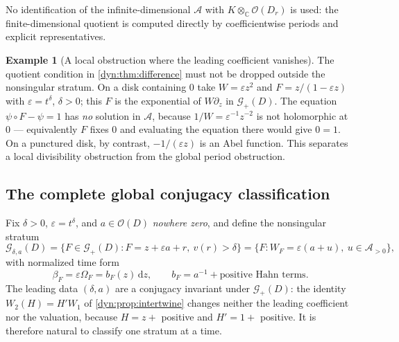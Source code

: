 \documentclass[11pt,letterpaper]{article}
\theoremstyle{definition}
\newtheorem{example}[example]{Example}
\theoremstyle{remark}
\newcommand{\C}{\mathbb C}
\newcommand{\OO}{\mathcal O}
\newcommand{\GG}{\mathscr G}
\newcommand{\AAA}{\mathscr A}
\newcommand{\eps}{\varepsilon}
\newcommand{\dd}{\,\mathrm d}
\numberwithin{equation}{section}
\begin{document}
No identification of the infinite-dimensional $\AAA$ with
$K\otimes_\C\OO(D_r)$ is used: the finite-dimensional quotient is computed
directly by coefficientwise periods and explicit representatives.

\begin{example}[A local obstruction where the leading coefficient vanishes]
\label{dyn:ex:localobstruction}
The quotient condition in \cref{dyn:thm:difference} must not be dropped
outside the nonsingular stratum. On a disk containing $0$ take
$W=\eps z^{2}$ and $F=z/(1-\eps z)$ with $\eps=t^{\delta}$, $\delta>0$;
this $F$ is the exponential of $W\partial_z$ in $\GG_+(D)$. The equation
$\psi\circ F-\psi=1$ has \emph{no} solution in $\AAA$, because
$1/W=\eps^{-1}z^{-2}$ is not holomorphic at $0$ --- equivalently $F$ fixes
$0$ and evaluating the equation there would give $0=1$. On a punctured
disk, by contrast, $-1/(\eps z)$ is an Abel function. This separates a
local divisibility obstruction from the global period obstruction.
\end{example}

\subsection{The complete global conjugacy classification}
Fix $\delta>0$, $\eps=t^{\delta}$, and $a\in\OO(D)$ \emph{nowhere zero},
and define the nonsingular stratum
\begin{equation}\label{dyn:eq:stratum}
 \GG_{\delta,a}(D)=\{F\in\GG_+(D):F=z+\eps a+r,\ v(r)>\delta\}
 =\{F:W_F=\eps(a+u),\ u\in\AAA_{>0}\},
\end{equation}
with normalized time form
\begin{equation}\label{dyn:eq:normalized-form}
 \beta_F=\eps\Omega_F=b_F(z)\dd z,\qquad
 b_F=a^{-1}+\text{positive Hahn terms} .
\end{equation}
The leading data $(\delta,a)$ are a conjugacy invariant under
$\GG_+(D)$: the identity $W_2(H)=H'W_1$ of \cref{dyn:prop:intertwine}
changes neither the leading coefficient nor the valuation, because
$H=z+$ positive and $H'=1+$ positive. It is therefore natural to classify
one stratum at a time.
\end{document}
